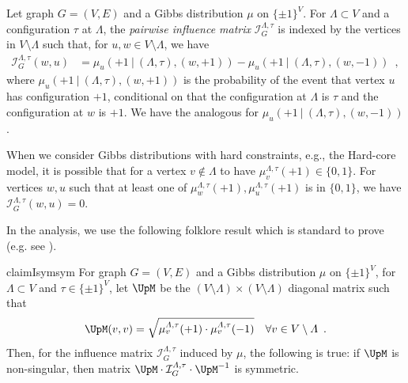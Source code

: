 \documentclass[11pt,reqno]{amsart}
\numberwithin{equation}{section}
\newcommand{\cI}{{\mathcal{I}}}
\newcommand{\blue}[1]{{\color{blue}#1}}
\newcommand{\electricviolet}[1]{{\color{electricviolet}#1}}
\newcommand{\red}[1]{{\color{red}#1}}
\newcommand{\infmatrix}{\cI}
\renewcommand{\blue}[1]{#1}
\renewcommand{\electricviolet}[1]{#1}
\renewcommand{\red}[1]{#1}
\newcommand{\ku}{\red{u}}
\newcommand{\kv}{\electricviolet{v}}
\newcommand{\kw}{\blue{w}}
\renewcommand{\ku}{u}
\renewcommand{\kv}{v}
\renewcommand{\kw}{w}
\begin{document}
Let graph $G=(V,E)$ and a Gibbs distribution $\mu$ on $\{\pm 1\}^V$.  For  $\Lambda\subset V$ and a configuration 
$\tau$ at $\Lambda$,  the {\em pairwise influence matrix}  $\infmatrix^{\Lambda,\tau}_{G}$ is   indexed by the vertices 
in $V\setminus \Lambda $  such that, for $\ku,\kw\in V\setminus \Lambda$, we have
%
\begin{align}\label{def:InfluenceMatrix}
\infmatrix^{\Lambda,\tau}_{G}(\kw,\ku) &
= \mu_{\ku}(+1 \ |\ (\Lambda, \tau), (\kw, +1))- \mu_{\ku}(+1 \ |\ (\Lambda, \tau), (\kw, -1)) \enspace, 
\end{align} 
%
where $\mu_{\ku}(+1 \ |\ (\Lambda, \tau), (\kw, +1))$ is the probability of the event that vertex $\ku$  has configuration
 $+1$, conditional on  that the configuration at $\Lambda$ is $\tau$ and the  configuration at $\kw$ is $+1$. We have 
 the analogous for $\mu_{\ku}(+1 \ |\ (\Lambda, \tau), (\kw, -1))$.



When we consider Gibbs distributions with hard constraints, e.g., the Hard-core model, it is possible  that for a 
vertex  $\kv\notin \Lambda$ to have $\mu^{\Lambda,\tau}_{\kv}(+1)\in \{0,1\}$.  For vertices $\kw,\ku$ such that 
at least one of $\mu^{\Lambda,\tau}_{\kw}(+1),\mu^{\Lambda,\tau}_{\ku}(+1)$ is in $\{0,1\}$, we have  
$\infmatrix^{\Lambda,\tau}_{G}(\kw,\ku)=0$. 




In the analysis, we use the following folklore result which is standard to prove (e.g. see ). 

\begin{restatable}{claim}{Isymsym}\label{claim:InfSymmetrisation}
For graph $G=(V,E)$ and a Gibbs distribution $\mu$ on $\{\pm 1\}^V$, 
%
for $\Lambda\subset V$ and $\tau\in \{\pm 1\}^V$, let $\UpM$ be the $(V\setminus \Lambda)\times (V\setminus \Lambda)$
diagonal matrix such that 
\begin{align}\nonumber
\UpM(\kv,\kv) &\textstyle =\sqrt{\mu^{\Lambda,\tau}_{\kv}(+1)\cdot \mu^{\Lambda,\tau}_{\kv}(-1)} &\forall \kv\in V\setminus \Lambda \enspace.
\end{align}
Then, for the influence matrix $\infmatrix^{\Lambda,\tau}_G$ induced by $\mu$, the following is true:
if $\UpM$ is non-singular, then matrix $\UpM\cdot \infmatrix^{\Lambda,\tau}_G \cdot \UpM^{-1}$ is symmetric. 
\end{restatable}
%
 


 
\end{document}
